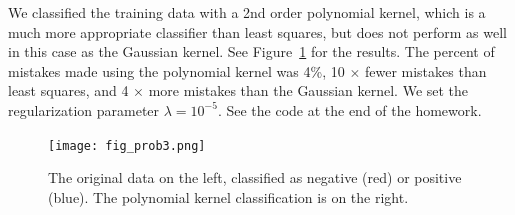 \documentclass{article}
\begin{document}
\begin{homeworkProblem}
   
    We classified the training data with a 2nd order polynomial kernel, which
    is a much more appropriate classifier than least squares, but does not
    perform as well in this case as the Gaussian kernel. See
    Figure~\ref{fig:prob3} for the results. The percent of mistakes made using
    the polynomial kernel was 4\%, 10 $\times$ fewer mistakes than least
    squares, and 4 $\times$ more mistakes than the Gaussian kernel.  We set the
    regularization parameter $\lambda = 10^{-5}$. See the code at the end of
    the homework. 

    \begin{figure}[!ht]
        
        \begin{centering}
        \texttt{[image: fig\_prob3.png]}

        \caption{\label{fig:prob3} The original data on the left, classified as
        negative (red) or positive (blue). The polynomial kernel classification
    is on the right.}
        \end{centering}

    \end{figure} 

\end{homeworkProblem}
\end{document}
